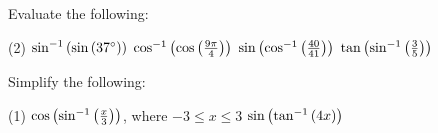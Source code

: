 \documentclass[../mathNotesPreamble]{subfiles}
\begin{document}
  \begin{ex*}
    Evaluate the following:
    \begin{extasks}[after-item-skip=\stretch{1}](2)
      \task $\sin^{-1}{\left(\sin{\left(37^\circ\right)}\right)}$
      \task $\cos^{-1}{\left(\cos{\left(\frac{9\pi}{4}\right)}\right)}$
      \task $\sin{\left(\cos^{-1}{\left(\frac{40}{41}\right)}\right)}$
      \task $\tan{\left(\sin^{-1}{\left(\frac{3}{5}\right)}\right)}$
    \end{extasks}
  \end{ex*}

  \begin{ex*}
    Simplify the following:
    \begin{extasks}[after-item-skip=\stretch{1}](1)
      \task $\cos{\left(\sin^{-1}{\left(\frac{x}{3}\right)}\right)}$, where $-3\leq x\leq 3$
      \task $\sin{\left(\tan^{-1}{\left(4x\right)}\right)}$
    \end{extasks}
  \end{ex*}

  \pagebreak
\end{document}
